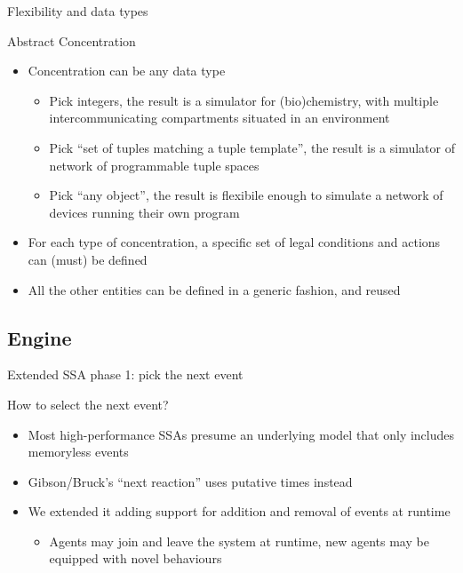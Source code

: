 \documentclass[presentation]{beamer} %
\begin{document}
\begin{frame}{Flexibility and data types}
  \begin{block}{Abstract Concentration}
    \begin{itemize}
    \item Concentration can be any data type
      \begin{itemize}
        \item Pick integers, the result is a simulator for (bio)chemistry, with multiple intercommunicating compartments situated in an environment \cite{drosophila}
        \item Pick ``set of tuples matching a tuple template'', the result is a simulator of network of programmable tuple spaces
        \item Pick ``any object'', the result is flexibile enough to simulate a network of devices running their own program \cite{protelis}
      \end{itemize}
    \item For each type of concentration, a specific set of legal conditions and actions can (must) be defined
    \item All the other entities can be defined in a generic fashion, and reused 
    \end{itemize}
  \end{block}
\end{frame}

\subsection{Engine}

\begin{frame}{Extended SSA phase 1: pick the next event}
  \begin{block}{How to select the next event?}
    \begin{itemize}
      \item Most high-performance SSAs presume an underlying model that only includes memoryless events \cite{slepoy2008}
      \item Gibson/Bruck's ``next reaction'' uses putative times instead
      \item We extended it adding support for addition and removal of events at runtime
      \begin{itemize}
        \item Agents may join and leave the system at runtime, new agents may be equipped with novel behaviours
      \end{itemize}
    \end{itemize}
  \end{block}
\end{frame}
\end{document}

